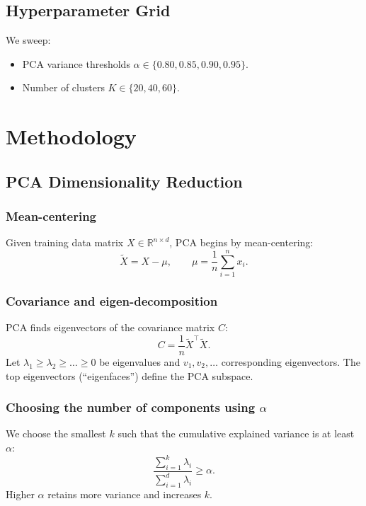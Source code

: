 \documentclass[11pt,a4paper]{article}
\begin{document}
\subsection{Hyperparameter Grid}
We sweep:
\begin{itemize}
    \item PCA variance thresholds $\alpha \in \{0.80, 0.85, 0.90, 0.95\}$.
    \item Number of clusters $K \in \{20, 40, 60\}$.
\end{itemize}

\section{Methodology}
\subsection{PCA Dimensionality Reduction}
\subsubsection{Mean-centering}
Given training data matrix $X \in \mathbb{R}^{n \times d}$, PCA begins by mean-centering:
\begin{equation}
\tilde{X} = X - \mu, \qquad \mu = \frac{1}{n}\sum_{i=1}^n x_i.
\end{equation}

\subsubsection{Covariance and eigen-decomposition}
PCA finds eigenvectors of the covariance matrix $C$:
\begin{equation}
C = \frac{1}{n} \tilde{X}^\top \tilde{X}.
\end{equation}
Let $\lambda_1 \ge \lambda_2 \ge \dots \ge 0$ be eigenvalues and $v_1, v_2, \dots$ corresponding eigenvectors. The top eigenvectors (``eigenfaces'') define the PCA subspace.

\subsubsection{Choosing the number of components using $\alpha$}
We choose the smallest $k$ such that the cumulative explained variance is at least $\alpha$:
\begin{equation}
\frac{\sum_{i=1}^{k} \lambda_i}{\sum_{i=1}^{d} \lambda_i} \ge \alpha.
\end{equation}
Higher $\alpha$ retains more variance and increases $k$.
\end{document}
